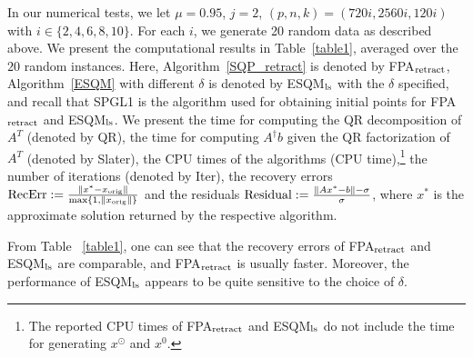 \documentclass[10pt]{article}
\numberwithin{equation}{section}
\def\R{{\rm I\!R}}
\def\xfeas{x^\odot}
\def\xorig{{x_{\rm orig}}}
\begin{document}

In our numerical tests, we let $\mu =0.95$, {\color{blue}$j = 2$, $(p,n,k) = (720i,2560i,120i)$} with $i\in \{2, 4, 6, 8, 10\}$. For each $i$, we generate {\color{blue}20 random data} as described above. We present the computational results in Table~\ref{table1}, averaged over the {\color{blue}$20$ random instances}. Here, Algorithm~\ref{SQP_retract} is denoted by FPA$_{\rm retract}$, Algorithm~\ref{ESQM} with different $\delta$ is denoted by ESQM$_{\rm ls}$ with the $\delta$ specified, and recall that SPGL1 is the algorithm used for obtaining initial points for FPA$_{\rm retract}$ and ESQM$_{\rm ls}$. We present the time for computing the QR decomposition of $A^T$ (denoted by QR), the time for computing $A^\dagger b$ given the QR factorization of $A^T$ (denoted by Slater), the CPU times of the algorithms (CPU time),\footnote{The reported CPU times of FPA$_{\rm retract}$ and ESQM$_{\rm ls}$ do not include the time for generating $\xfeas$ and $x^0$.} the number of iterations (denoted by Iter), the recovery errors $\text{RecErr} := \frac{\|x^* - \xorig\|}{\max\{1, \|\xorig\|\}}$ and the residuals ${\rm Residual} := \frac{\|Ax^* - b\| - \sigma }{\sigma}$, where $x^*$ is the approximate solution returned by the respective algorithm.

From Table ~\ref{table1}, one can see that the recovery errors of FPA$_{\rm retract}$ and ESQM$_{\rm ls}$ are comparable, and FPA$_{\rm retract}$ is usually faster. Moreover, the performance of ESQM$_{\rm ls}$ appears to be quite sensitive to the choice of $\delta$.

\end{document}
